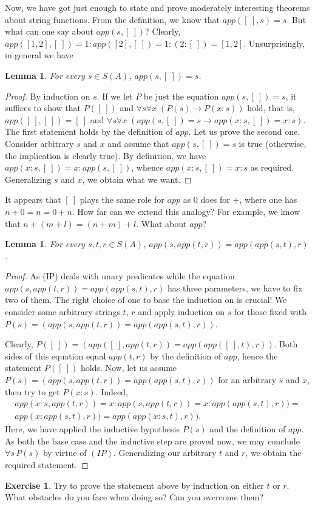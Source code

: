 \documentclass[12pt,notitlepage]{article}
\theoremstyle{plain}
\newtheorem{lemma}[thm]{Lemma}
\theoremstyle{definition}
\newtheorem{exc}[thm]{Exercise}
\theoremstyle{plain}
\newcommand{\1}{\mathbf{1}}
\newcommand{\0}{\mathbf{0}}
\begin{document}
Now, we have got just enough to state and prove moderately interesting theorems about string functions. From the definition, we know that $app([\ ], s) = s$. But what can one say about $app (s, [\ ])$? Clearly, $app ([1, 2], [\ ]) = 1 : app ([2],  [\ ]) = 1 : (2 : [\ ]) = [1, 2]$. Unsurprisingly, in general we have
\begin{lemma}\label{cs:app_nil_r}
For every $s \in S(A)$, $app (s, [\ ]) = s$.
\end{lemma}
\begin{proof}
By induction on $s$. If we let $P$ be just the equation $app (s, [\ ]) = s$, it suffices to show that $P([\ ])$ and $\forall s \forall x\; (P(s) \to P(x:s))$ hold, that is, $app ([\ ], [\ ]) = [\ ]$ and $\forall s \forall x\; (app (s, [\ ]) = s \to app (x : s, [\ ]) = x : s)$. The first statement holds by the definition of $app$. Let us prove the second one. Consider arbitrary $s$ and $x$ and assume that $app (s, [\ ]) = s$ is true (otherwise, the implication is clearly true). By definition, we have $app (x : s, [\ ]) = x : app(s, [\ ])$, whence $app (x : s, [\ ]) = x : s$ as required. Generalizing $s$ and $x$, we obtain what we want.
\end{proof}

It appears that $[\ ]$ plays the same role for $app$ as $0$ does for ${+}$, where one has $n + 0 = n = 0 + n$. How far can we extend this analogy? For example, we know that $n + (m + l) = (n + m) + l$. What about $app$?

\begin{lemma}\label{cs:app_assoc}
For every $s, t, r \in S(A)$, $app (s, app(t, r)) = app (app (s, t), r)$.
\end{lemma}
\begin{proof}
As (IP) deals with unary predicates while the equation $app (s, app(t, r)) = app (app (s, t), r)$ has three parameters, we have to fix two of them. The right choice of one to base the induction on is crucial! We consider some arbitrary strings $t$, $r$ and apply induction on $s$ for those fixed with $P(s) = (app (s, app(t, r)) = app (app (s, t), r))$. 

Clearly, $P([\ ]) = (app ([\ ], app(t, r)) = app (app ([\ ], t), r))$. Both sides of this equation equal $app(t,r)$ by the definition of $app$, hence the statement $P([\ ])$ holds. Now, let us assume $P(s) = (app (s, app(t, r)) = app (app (s, t), r))$ for an arbitrary $s$ and $x$, then try to get $P(x:s)$. Indeed,
\begin{multline*}
app (x:s, app(t, r)) = x : app (s, app(t, r)) = x : app (app (s, t), r)) =\\
 app (x : app (s, t), r)) = app (app (x : s, t), r)).
\end{multline*}
Here, we have applied the inductive hypothesis $P(s)$ and the definition of $app$. As both the base case and the inductive step are proved now, we may conclude $\forall s\, P(s)$ by virtue of $(IP)$. Generalizing our arbitrary $t$ and $r$, we obtain the required statement.
\end{proof}
\begin{exc}
Try to prove the statement above by induction on either $t$ or $r$. What obstacles do you face when doing so? Can you overcome them?
\end{exc}
\end{document}
